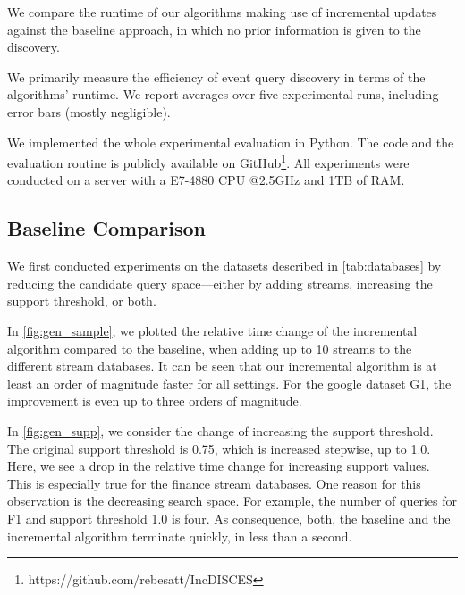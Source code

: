 We compare the runtime of our algorithms making use of incremental updates against
the baseline approach, in which no prior information is given to the
discovery.


 We primarily measure the efficiency of event query
discovery in terms of the algorithms' runtime. We report averages over five
experimental runs, including error bars (mostly negligible).

We implemented the whole experimental evaluation in Python.
The code and the evaluation routine is publicly available on GitHub\footnote{https://github.com/rebesatt/IncDISCES}.
All experiments were conducted on a server with a E7-4880 CPU @2.5GHz and
1TB of RAM.
\subsection{Baseline Comparison}
\label{sec:exp_sota}

We first conducted experiments on the datasets described in \autoref{tab:databases} by reducing
the candidate query space—either by adding streams, increasing the support threshold, or both.

In \autoref{fig:gen_sample}, we plotted the relative time change of the
incremental algorithm
compared to the baseline, when adding up to 10 streams to the different
stream databases.
It can be seen that our incremental algorithm is at least an order of
magnitude faster for all settings.
For the google dataset G1, the improvement is even up to three orders of
magnitude.

In \autoref{fig:gen_supp}, we consider the change of increasing the support
threshold.
The original support threshold is 0.75, which is increased stepwise, up to
1.0.
Here, we see a drop in the relative time change for increasing support
values. This is
especially true for the finance stream databases. One reason for this
observation is the
decreasing search space. For example, the number of queries for F1 and
support threshold
1.0 is four. As consequence, both, the baseline and the incremental
algorithm terminate quickly, in less than a second.

